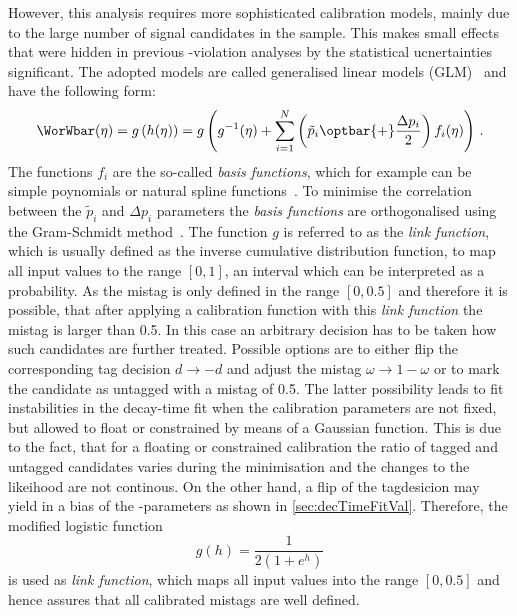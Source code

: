 However, this analysis requires more sophisticated calibration models, mainly due to the large number of signal candidates in the \BdToDpi sample.
This makes small effects that were hidden in previous \CP-violation analyses by the statistical ucnertainties significant.
The adopted models are called generalised linear models (GLM)~\cite{GLM} and have the following form:
\begin{equation}
\WorWbar(\eta) = g\left(h(\eta)\right) = g\left( g^{-1} (\eta) + \sum_{i=1}^{N} \left(\tilde{p}_i \kern 0.0em\optbar{\kern -0.0em +} \frac{\Delta p_i}{2}\right) f_i(\eta)\right)\,.
\end{equation}
The functions $f_i$ are the so-called \emph{basis functions}, which for example can be simple poynomials or natural spline functions~\cite{Nsplines}.
To minimise the correlation between the $\tilde{p}_i$ and $\Delta p_i$ parameters the \emph{basis functions} are orthogonalised using the Gram-Schmidt method~\cite{GramSchmidt}.
The function $g$ is referred to as the \emph{link function}, which is usually defined as the inverse cumulative distribution function, to map all input values to the range $[0,1]$, \ie an interval which can be interpreted as a probability.
As the mistag is only defined in the range $[0, 0.5]$ and therefore it is possible, that after applying a calibration function with this \emph{link function} the mistag is larger than \num{0.5}.
In this case an arbitrary decision has to be taken how such candidates are further treated.
Possible options are to either flip the corresponding tag decision $d\to-d$ and adjust the mistag $\omega\to1-\omega$ or to mark the candidate as untagged with a mistag of \num{0.5}.
The latter possibility leads to fit instabilities in the decay-time fit when the calibration parameters are not fixed, but allowed to float or constrained by means of a Gaussian function.
This is due to the fact, that for a floating or constrained calibration the ratio of tagged and untagged candidates varies during the minimisation and the changes to the likeihood are not continous.
On the other hand, a flip of the tagdesicion may yield in a bias of the \CP-parameters as shown in \cref{sec:decTimeFitVal}.
Therefore, the modified logistic function
\begin{equation}
g(h)=\frac{1}{2\left(1+e^h\right)}\label{eq:modlink}
\end{equation}
is used as \emph{link function}, which maps all input values into the range $[0, 0.5]$ and hence assures that all calibrated mistags are well defined.

